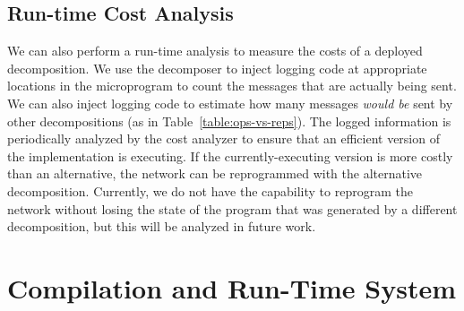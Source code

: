 

\subsection{Run-time Cost Analysis}\label{sect:runtimeCost}

We can also perform a run-time analysis to measure the costs of a deployed
decomposition. We use the decomposer to inject logging code at appropriate
locations in the microprogram to count the messages that are
actually being sent. We can also inject logging code to estimate how many
messages {\em would be} sent by other decompositions (as in
Table~\ref{table:ops-vs-reps}). The logged information is periodically
analyzed by the cost analyzer to ensure that an efficient version of
the implementation is executing. If the currently-executing version is more
costly than an alternative, the network can be reprogrammed with the
alternative decomposition. Currently, we do not have the capability to
reprogram the network without losing the state of the program that was
generated by a different decomposition, but this will be analyzed
in future work.

\section{Compilation and Run-Time System} \label{sect:RTS}

